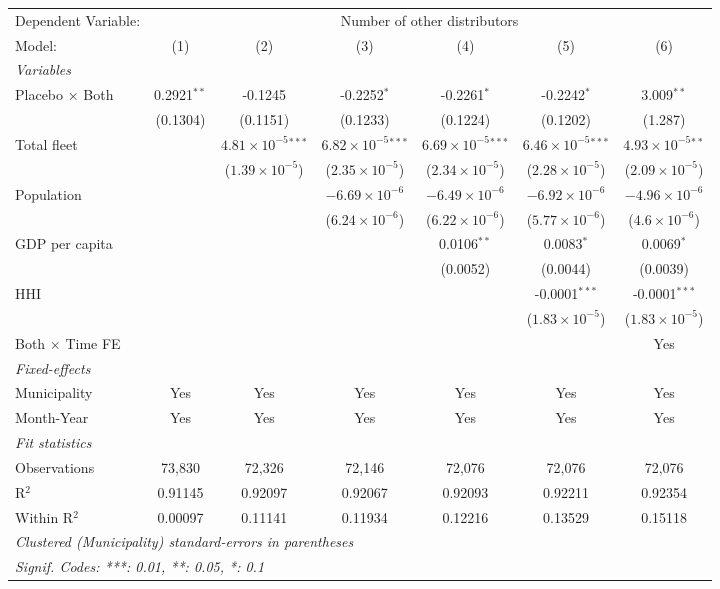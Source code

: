 \documentclass[
]{article}
\begin{document}
\begin{tabular}{lcccccc}
\tabularnewline\midrule\midrule
Dependent Variable:&\multicolumn{6}{c}{Number of other distributors}\\
Model:&(1) & (2) & (3) & (4) & (5) & (6)\\
\midrule \emph{Variables}&   &   &   &   &   &  \\
Placebo $\times $ Both & 0.2921$^{**}$ & -0.1245 & -0.2252$^{*}$ & -0.2261$^{*}$ & -0.2242$^{*}$ & 3.009$^{**}$\\
  &(0.1304) & (0.1151) & (0.1233) & (0.1224) & (0.1202) & (1.287)\\
Total fleet &    & $4.81\times 10^{-5}$$^{***}$ & $6.82\times 10^{-5}$$^{***}$ & $6.69\times 10^{-5}$$^{***}$ & $6.46\times 10^{-5}$$^{***}$ & $4.93\times 10^{-5}$$^{**}$\\
  &   & ($1.39\times 10^{-5}$) & ($2.35\times 10^{-5}$) & ($2.34\times 10^{-5}$) & ($2.28\times 10^{-5}$) & ($2.09\times 10^{-5}$)\\
Population &    &    & $-6.69\times 10^{-6}$ & $-6.49\times 10^{-6}$ & $-6.92\times 10^{-6}$ & $-4.96\times 10^{-6}$\\
  &   &    & ($6.24\times 10^{-6}$) & ($6.22\times 10^{-6}$) & ($5.77\times 10^{-6}$) & ($4.6\times 10^{-6}$)\\
GDP per capita &    &    &    & 0.0106$^{**}$ & 0.0083$^{*}$ & 0.0069$^{*}$\\
  &   &    &    & (0.0052) & (0.0044) & (0.0039)\\
HHI &    &    &    &    & -0.0001$^{***}$ & -0.0001$^{***}$\\
  &   &    &    &    & ($1.83\times 10^{-5}$) & ($1.83\times 10^{-5}$)\\
Both $\times$ Time FE &  &  &  &  &  & Yes\\
\midrule \emph{Fixed-effects}&   &   &   &   &   &  \\
Municipality & Yes & Yes & Yes & Yes & Yes & Yes\\
Month-Year & Yes & Yes & Yes & Yes & Yes & Yes\\
\midrule \emph{Fit statistics}&  & & & & & \\
Observations & 73,830&72,326&72,146&72,076&72,076&72,076\\
R$^2$ & 0.91145&0.92097&0.92067&0.92093&0.92211&0.92354\\
Within R$^2$ & 0.00097&0.11141&0.11934&0.12216&0.13529&0.15118\\
\midrule\midrule\multicolumn{7}{l}{\emph{Clustered (Municipality) standard-errors in parentheses}}\\
\multicolumn{7}{l}{\emph{Signif. Codes: ***: 0.01, **: 0.05, *: 0.1}}\\
\end{tabular}
\end{document}
